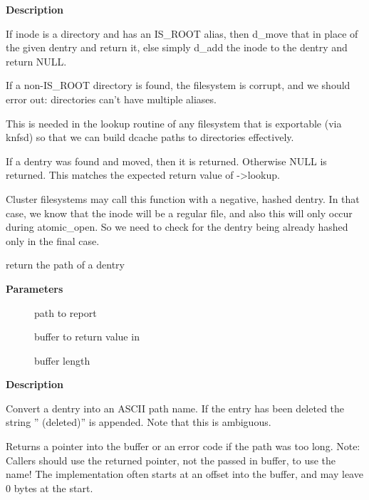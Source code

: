 \documentclass[a4paper,8pt,english]{sphinxmanual}
\begin{document}
\textbf{Description}

If inode is a directory and has an IS\_ROOT alias, then d\_move that in
place of the given dentry and return it, else simply d\_add the inode
to the dentry and return NULL.

If a non-IS\_ROOT directory is found, the filesystem is corrupt, and
we should error out: directories can't have multiple aliases.

This is needed in the lookup routine of any filesystem that is exportable
(via knfsd) so that we can build dcache paths to directories effectively.

If a dentry was found and moved, then it is returned.  Otherwise NULL
is returned.  This matches the expected return value of -\textgreater{}lookup.

Cluster filesystems may call this function with a negative, hashed dentry.
In that case, we know that the inode will be a regular file, and also this
will only occur during atomic\_open. So we need to check for the dentry
being already hashed only in the final case.

\begin{fulllineitems}
\label{filesystems/index:c.d_path}
return the path of a dentry

\end{fulllineitems}


\textbf{Parameters}
\begin{description}
\item[{}] \leavevmode
path to report

\item[{}] \leavevmode
buffer to return value in

\item[{}] \leavevmode
buffer length

\end{description}

\textbf{Description}

Convert a dentry into an ASCII path name. If the entry has been deleted
the string '' (deleted)'' is appended. Note that this is ambiguous.

Returns a pointer into the buffer or an error code if the path was
too long. Note: Callers should use the returned pointer, not the passed
in buffer, to use the name! The implementation often starts at an offset
into the buffer, and may leave 0 bytes at the start.
\end{document}
